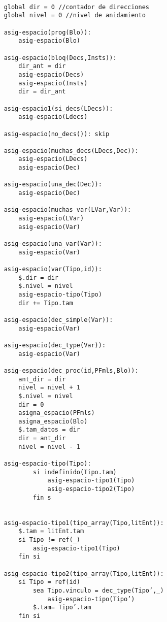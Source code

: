 \begin{lstlisting}

    global dir = 0 //contador de direcciones
    global nivel = 0 //nivel de anidamiento
    
    asig-espacio(prog(Blo)):
        asig-espacio(Blo)

    asig-espacio(bloq(Decs,Insts)):
        dir_ant = dir
        asig-espacio(Decs)
        asig-espacio(Insts)
        dir = dir_ant
    
    asig-espacio1(si_decs(LDecs)):
        asig-espacio(Ldecs)
    
    asig-espacio(no_decs()): skip
    
    asig-espacio(muchas_decs(LDecs,Dec)):
        asig-espacio(LDecs)
        asig-espacio(Dec)
    
    asig-espacio(una_dec(Dec)):
        asig-espacio(Dec)

    asig-espacio(muchas_var(LVar,Var)):
        asig-espacio(LVar)
        asig-espacio(Var)

    asig-espacio(una_var(Var)):
        asig-espacio(Var)
    
    asig-espacio(var(Tipo,id)):
        $.dir = dir
        $.nivel = nivel
        asig-espacio-tipo(Tipo)
        dir += Tipo.tam
    
    asig-espacio(dec_simple(Var)):
        asig-espacio(Var)

    asig-espacio(dec_type(Var)):
        asig-espacio(Var)
    
    asig-espacio(dec_proc(id,PFmls,Blo)):
        ant_dir = dir 
        nivel = nivel + 1
        $.nivel = nivel
        dir = 0 
        asigna_espacio(PFmls)
        asigna_espacio(Blo)
        $.tam_datos = dir 
        dir = ant_dir 
        nivel = nivel - 1 
        
    asig-espacio-tipo(Tipo):
            si indefinido(Tipo.tam) 
                asig-espacio-tipo1(Tipo) 
                asig-espacio-tipo2(Tipo)
            fin s

            
    asig-espacio-tipo1(tipo_array(Tipo,litEnt)):
        $.tam = litEnt.tam
        si Tipo != ref(_)
            asig-espacio-tipo1(Tipo)
        fin si

    asig-espacio-tipo2(tipo_array(Tipo,litEnt)):
        si Tipo = ref(id)
            sea Tipo.vinculo = dec_type(Tipo’,_)
                asig-espacio-tipo(Tipo’) 
            $.tam= Tipo’.tam
        fin si 


\end{lstlisting}
